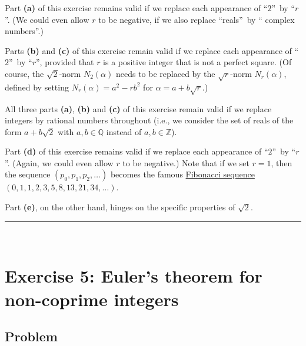 \documentclass[paper=a4, fontsize=12pt]{scrartcl}%
\theoremstyle{plainsl}
\theoremstyle{definition}
\theoremstyle{remark}
\begin{document}
Part \textbf{(a)} of this exercise remains valid if we replace each appearance
of \textquotedblleft$2$\textquotedblright\ by \textquotedblleft$r$%
\textquotedblright. (We could even allow $r$ to be negative, if we also
replace \textquotedblleft reals\textquotedblright\ by \textquotedblleft
complex numbers\textquotedblright.)

Parts \textbf{(b)} and \textbf{(c)} of this exercise remain valid if we
replace each appearance of \textquotedblleft$2$\textquotedblright\ by
\textquotedblleft$r$\textquotedblright, provided that $r$ is a positive
integer that is not a perfect square. (Of course, the $\sqrt{2}$-norm
$N_{2}\left(  \alpha\right)  $ needs to be replaced by the $\sqrt{r}$-norm
$N_{r}\left(  \alpha\right)  $, defined by setting $N_{r}\left(
\alpha\right)  =a^{2}-rb^{2}$ for $\alpha=a+b\sqrt{r}$.)

All three parts \textbf{(a)}, \textbf{(b)} and \textbf{(c)} of this exercise
remain valid if we replace integers by rational numbers throughout (i.e., we
consider the set of reals of the form $a+b\sqrt{2}$ with $a,b\in\mathbb{Q}$
instead of $a,b\in\mathbb{Z}$).

Part \textbf{(d)} of this exercise remains valid if we replace each appearance
of \textquotedblleft$2$\textquotedblright\ by \textquotedblleft$r$%
\textquotedblright. (Again, we could even allow $r$ to be negative.) Note that
if we set $r=1$, then the sequence $\left(  p_{0},p_{1},p_{2},\ldots\right)  $
becomes the famous
\href{https://en.wikipedia.org/wiki/Fibonacci_number}{Fibonacci sequence}
$\left(  0,1,1,2,3,5,8,13,21,34,\ldots\right)  $.

Part \textbf{(e)}, on the other hand, hinges on the specific properties of
$\sqrt{2}$.

\rule{\linewidth}{0.3pt} \\[0.4cm]

\section{Exercise 5: Euler's theorem for non-coprime integers}

\subsection{Problem}
\end{document}
